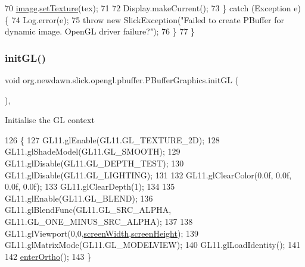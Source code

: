 \begin{DoxyCode}
70             \mbox{\hyperlink{classorg_1_1newdawn_1_1slick_1_1opengl_1_1pbuffer_1_1_p_buffer_graphics_add068041cc793fa55a4019603b988d72}{image}}.\mbox{\hyperlink{classorg_1_1newdawn_1_1slick_1_1_image_a73b8afaa9bb100680f5bec87f4a75cdb}{setTexture}}(tex);
71             
72             Display.makeCurrent();
73         \} \textcolor{keywordflow}{catch} (Exception e) \{
74             Log.error(e);
75             \textcolor{keywordflow}{throw} \textcolor{keyword}{new} SlickException(\textcolor{stringliteral}{"Failed to create PBuffer for dynamic image. OpenGL driver failure?"});
76         \}
77     \}
\end{DoxyCode}
\mbox{\label{classorg_1_1newdawn_1_1slick_1_1opengl_1_1pbuffer_1_1_p_buffer_graphics_ade988e7cf903a9960068b18589c6474b}} 
\subsubsection{\texorpdfstring{init\+G\+L()}{initGL()}}
{\footnotesize\ttfamily void org.\+newdawn.\+slick.\+opengl.\+pbuffer.\+P\+Buffer\+Graphics.\+init\+GL (\begin{DoxyParamCaption}{ }\end{DoxyParamCaption})\hspace{0.3cm}{\ttfamily [inline]}, {\ttfamily [protected]}}

Initialise the GL context 
\begin{DoxyCode}
126                             \{
127         GL11.glEnable(GL11.GL\_TEXTURE\_2D);
128         GL11.glShadeModel(GL11.GL\_SMOOTH);        
129         GL11.glDisable(GL11.GL\_DEPTH\_TEST);
130         GL11.glDisable(GL11.GL\_LIGHTING);                    
131         
132         GL11.glClearColor(0.0f, 0.0f, 0.0f, 0.0f);                
133         GL11.glClearDepth(1);                                       
134         
135         GL11.glEnable(GL11.GL\_BLEND);
136         GL11.glBlendFunc(GL11.GL\_SRC\_ALPHA, GL11.GL\_ONE\_MINUS\_SRC\_ALPHA);
137         
138         GL11.glViewport(0,0,\mbox{\hyperlink{classorg_1_1newdawn_1_1slick_1_1_graphics_adbb4b10050a8bcf8e496130509784f71}{screenWidth}},\mbox{\hyperlink{classorg_1_1newdawn_1_1slick_1_1_graphics_a24cd14275ad2dcd82fcd843ceab6a80b}{screenHeight}});
139         GL11.glMatrixMode(GL11.GL\_MODELVIEW);
140         GL11.glLoadIdentity();
141         
142         \mbox{\hyperlink{classorg_1_1newdawn_1_1slick_1_1opengl_1_1pbuffer_1_1_p_buffer_graphics_af2b72d6f76bcd53819c64eaa0bbe92f5}{enterOrtho}}();
143     \}
\end{DoxyCode}


